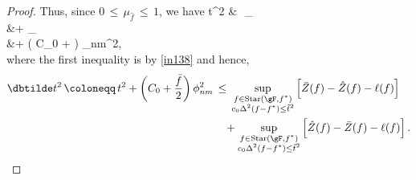 \documentclass[twoside,11pt]{article}
\begin{document}
\begin{proof}
Thus, since $0 \,\leq\, \mu_{\hat f} \,\leq\, 1$, we have 
\bea 
\tilde t^2 &\,\leq\, \sup_{}  \\
&\quad + \sup_{}  \\
&\quad + \left( C_0 +  \right) \phi_{nm}^2, \\
\bea
where the first inequality is by \eqref{in138}
and hence,
\begin{align*}
\dbtilde t^2 \,\coloneqq\, t^2 + \left( C_0 + \frac{\bar f}{2} \right) \phi_{nm}^2 &\,\leq\, \sup_{\substack{f \in \text{Star}(\gF, f^\ast)\\ c_0\Delta^2(f - f^\ast) \leq \tilde t^2}} \left[ \bar Z(f) - \hat Z(f) - \ell(f) \right] \\
&\quad + \sup_{\substack{f \in \text{Star}(\gF, f^\ast)\\ c_0\Delta^2(f - f^\ast) \leq \tilde t^2}} \left[ \hat Z(f) - \bar Z(f) - \ell(f) \right].
\end{align*}
\end{proof}
\end{document}
